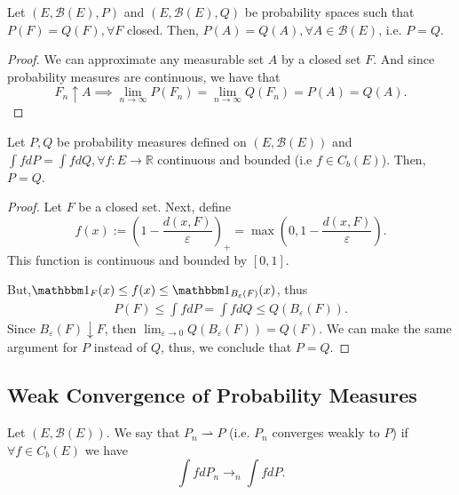 \begin{corollary}
	Let $(E, \mathcal B(E), P)$ and $(E, \mathcal B(E), Q)$ be probability
	spaces such that $P(F)= Q(F), \forall F$ closed.
	Then, $P(A) = Q(A), \forall A \in \mathcal B(E)$, i.e. $P=Q$.
\end{corollary}
\begin{proof}
	We can approximate any measurable set $A$ by a closed set $F$.
	And since probability measures are continuous, we have
	that
	\begin{displaymath}
		F_n \uparrow A \implies \lim_{n\to \infty}
		P(F_n) = \lim_{n\to \infty} Q(F_n) = P(A) = Q(A).
	\end{displaymath}

\end{proof}

\begin{theorem}
	Let $P, Q$ be probability measures defined on $(E,\mathcal B(E))$ and
	$\int f dP = \int f dQ, \forall f:E \to \mathbb R$
	continuous and bounded (i.e $ f \in C_b(E)$).
	Then, $P = Q$.
\end{theorem}
\begin{proof}
	Let $F$ be a closed set. Next, define
	\begin{displaymath}
		f(x) := \left(
		1 - \frac{d(x,F)}{\varepsilon}
		\right)_+ =
		\max\left(0,
		1 - \frac{d(x,F)}{\varepsilon}
		\right).
	\end{displaymath}
	This function is continuous and bounded by $[0,1]$.

	But,$\mathbbm 1_F(x) \leq f(x) \leq \mathbbm 1_{B_\varepsilon(F)}(x)$, thus
	\begin{align*}
		P(F) \leq \int f dP = \int f dQ \leq Q(B_{\varepsilon}(F)).
	\end{align*}
	Since $B_\varepsilon (F)\downarrow F$, then
	$\lim_{\varepsilon \to 0 } Q(B_{\varepsilon}(F)) = Q(F)$.
  We can make the same argument for $P$ instead of $Q$, thus,
  we conclude that $P=Q$.

\end{proof}

\subsection{Weak Convergence of Probability Measures}

\begin{definition}
	Let $(E, \mathcal B(E))$. We say that
	$P_n \rightharpoonup P$ (i.e. $P_n$ converges weakly to $P$) if
	$\forall f \in C_b(E)$ we have
	\begin{displaymath}
		\int f dP_n \to_n \int f dP.
	\end{displaymath}
\end{definition}

